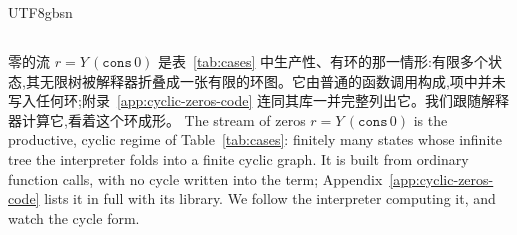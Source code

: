 \begin{CJK*}{UTF8}{gbsn}
  \subsection{}\label{sec:application-cycles}

  \ifTablambdaChinese
  零的流 $r = Y\,(\mathtt{cons}\,0)$ 是表~\ref{tab:cases} 中生产性、有环的那一情形:有限多个状态,其无限树被解释器折叠成一张有限的环图。它由普通的函数调用构成,项中并未写入任何环;附录~\ref{app:cyclic-zeros-code} 连同其库一并完整列出它。我们跟随解释器计算它,看着这个环成形。
  \else
  The stream of zeros $r = Y\,(\mathtt{cons}\,0)$ is the productive, cyclic regime of Table~\ref{tab:cases}: finitely many states whose infinite tree the interpreter folds into a finite cyclic graph. It is built from ordinary function calls, with no cycle written into the term; Appendix~\ref{app:cyclic-zeros-code} lists it in full with its library. We follow the interpreter computing it, and watch the cycle form.
  \fi


\end{CJK*}
